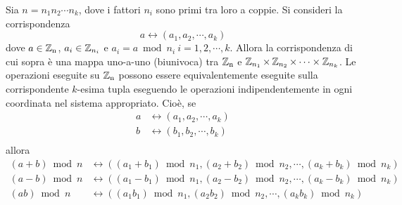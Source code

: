\begin{teorema}
Sia $n=n_1n_2\cdots n_k$, dove i fattori $n_i$ sono primi tra loro a coppie. Si consideri la corrispondenza 
\[
a \leftrightarrow (a_1, a_2, \cdots , a_k)
\]
dove $a\in\operatorname*{\mathbb{Z}_n}$, $a_i\in\operatorname*{\mathbb{Z}}_{n_i}$ e $a_i=a\bmod n_i \ i=1,2,\cdots , k$.
Allora la corrispondenza di cui sopra è una mappa uno-a-uno (biunivoca) tra $\operatorname*{\mathbb{Z}_n}$ e $\operatorname*{\mathbb{Z}}_{n_1} \times \operatorname*{\mathbb{Z}}_{n_2} \times \cdots \times \operatorname*{\mathbb{Z}}_{n_k}$. Le operazioni eseguite su $\operatorname*{\mathbb{Z}_n}$ possono essere equivalentemente eseguite sulla corrispondente $k$-esima tupla eseguendo le operazioni indipendentemente in ogni coordinata nel sistema appropriato. Cioè, se
\begin{align*}
a &\leftrightarrow (a_1, a_2, \cdots , a_k) \\
b &\leftrightarrow (b_1, b_2, \cdots , b_k) \\
\end{align*}
allora
\begin{align*}
(a+b)\bmod n &\leftrightarrow ((a_1+b_1)\bmod n_1, (a_2+b_2)\bmod n_2, \cdots , (a_k+b_k)\bmod n_k) \\
(a-b)\bmod n &\leftrightarrow ((a_1-b_1)\bmod n_1, (a_2-b_2)\bmod n_2, \cdots , (a_k-b_k)\bmod n_k) \\
(ab)\bmod n &\leftrightarrow ((a_1b_1)\bmod n_1, (a_2b_2)\bmod n_2, \cdots , (a_kb_k)\bmod n_k)
\end{align*}
\end{teorema}
